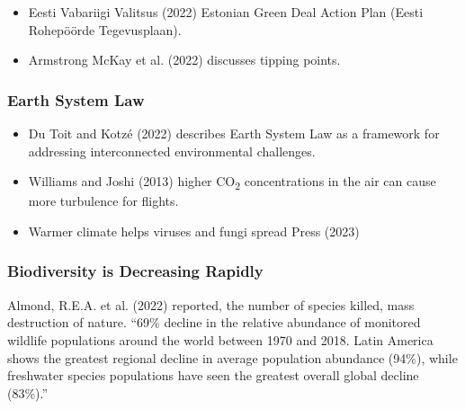 \documentclass[
  letterpaper,
  DIV=11,
  numbers=noendperiod]{scrartcl}
\providecommand{\tightlist}{%
  \setlength{\itemsep}{0pt}\setlength{\parskip}{0pt}}\usepackage{longtable,booktabs,array}
\begin{document}
\begin{itemize}
\tightlist
\item
  Eesti Vabariigi Valitsus (2022) Estonian Green Deal Action Plan (Eesti
  Rohepöörde Tegevusplaan).
\item
  Armstrong McKay et al. (2022) discusses tipping points.
\end{itemize}

\subsubsection{Earth System Law}\label{earth-system-law}

\begin{itemize}
\item
  Du Toit and Kotzé (2022) describes Earth System Law as a framework for
  addressing interconnected environmental challenges.
\item
  Williams and Joshi (2013) higher CO\textsubscript{2} concentrations in
  the air can cause more turbulence for flights.
\item
  Warmer climate helps viruses and fungi spread Press (2023)
\end{itemize}

\subsubsection{Biodiversity is Decreasing
Rapidly}\label{biodiversity-is-decreasing-rapidly}

Almond, R.E.A. et al. (2022) reported, the number of species killed,
mass destruction of nature. ``69\% decline in the relative abundance of
monitored wildlife populations around the world between 1970 and 2018.
Latin America shows the greatest regional decline in average population
abundance (94\%), while freshwater species populations have seen the
greatest overall global decline (83\%).''
\end{document}
